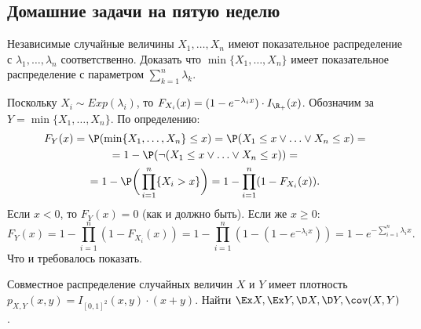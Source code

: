 \subsection{Домашние задачи на пятую неделю}
\begin{problem}
    Независимые случайные величины $X_1, \ldots, X_n$ имеют показательное распределение с $\lambda_1, \ldots, \lambda_n$ соответственно.
    Доказать что $\min\{X_1, \ldots, X_n\}$ имеет показательное распределение с параметром $\sum\limits_{k = 1}^n \lambda_k$.
\end{problem}
\begin{solution}
    Поскольку $X_i \sim Exp(\lambda_i)$, то $F_{X_i}(x) = (1 - e^{-\lambda_i x})\cdot I_{\R_+}(x)$.
    Обозначим за $Y = \min\{X_1, \ldots, X_n\}$.
    По определению:
    \begin{multline*}
        F_{Y}(x) = \P(\min\{X_1, \ldots, X_n\} \leq x) = \P(X_1 \leq x \vee \ldots \vee X_n \leq x) = \\ = 1 - \P(\neg(X_1 \leq x \vee \ldots \vee X_n \leq x)) =
        \\ = 1 - \P\biggr(\prod_{i = 1}^n \{X_i > x\}\biggr) =  1 - \prod_{i = 1}^n(1 - F_{X_i}(x)).
    \end{multline*}
    Если $x < 0$, то $F_Y(x) = 0$ (как и должно быть). Если же $x \geq 0$:
    \[
        F_{Y}(x) = 1 - \prod_{i = 1}^n(1 - F_{X_i}(x)) = 1 - \prod_{i = 1}^n(1 - (1 - e^{-\lambda_i x})) = 1 - e^{-\sum\limits_{i = 1}^n \lambda_i x}.
    \]
    Что и требовалось показать.
\end{solution}
\begin{problem}
    Совместное распределение случайных величин $X$ и $Y$ имеет плотность $p_{X, Y}(x, y) = I_{[0, 1]^2}(x, y)\cdot(x + y)$.
    Найти $\Ex X, \Ex Y, \D X, \D Y, \cov(X, Y)$.
\end{problem}
